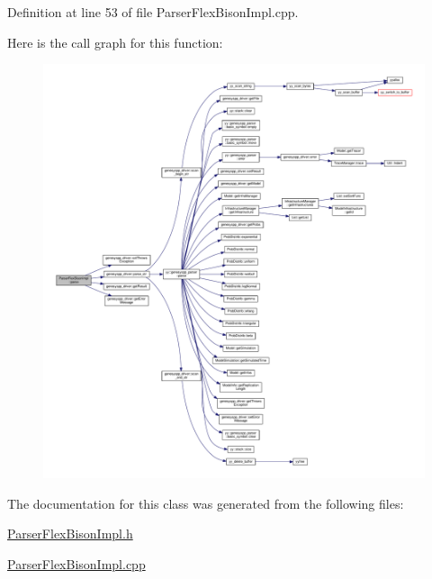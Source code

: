 Definition at line 53 of file Parser\-Flex\-Bison\-Impl.\-cpp.



Here is the call graph for this function\-:
\nopagebreak
\begin{figure}[H]
\begin{center}
\leavevmode
\includegraphics[width=350pt]{class_parser_flex_bison_impl_a25fd55be19467472557819b6eba9f833_cgraph}
\end{center}
\end{figure}




The documentation for this class was generated from the following files\-:\begin{DoxyCompactItemize}
\item 
\hyperlink{_parser_flex_bison_impl_8h}{Parser\-Flex\-Bison\-Impl.\-h}\item 
\hyperlink{_parser_flex_bison_impl_8cpp}{Parser\-Flex\-Bison\-Impl.\-cpp}\end{DoxyCompactItemize}
